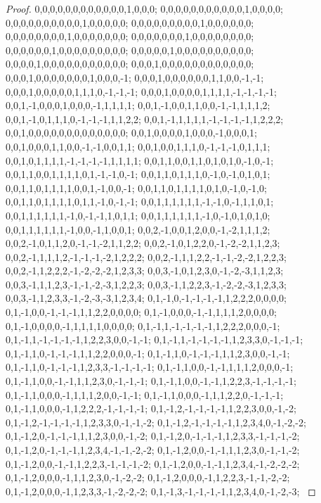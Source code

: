 \documentclass{article}
\begin{document}
\begin{proof}
{{0,0,0,0,0,0,0,0,0,0,0,0,1,0,0,0; 0,0,0,0,0,0,0,0,0,0,0,1,0,0,0,0; 0,0,0,0,0,0,0,0,0,0,1,0,0,0,0,0; 0,0,0,0,0,0,0,0,0,1,0,0,0,0,0,0; 0,0,0,0,0,0,0,0,1,0,0,0,0,0,0,0; 0,0,0,0,0,0,0,1,0,0,0,0,0,0,0,0; 0,0,0,0,0,0,1,0,0,0,0,0,0,0,0,0; 0,0,0,0,0,1,0,0,0,0,0,0,0,0,0,0; 0,0,0,0,1,0,0,0,0,0,0,0,0,0,0,0; 0,0,0,1,0,0,0,0,0,0,0,0,0,0,0,0; 0,0,0,1,0,0,0,0,0,0,0,1,0,0,0,-1; 0,0,0,1,0,0,0,0,0,0,1,1,0,0,-1,-1;
0,0,0,1,0,0,0,0,0,1,1,1,0,-1,-1,-1; 0,0,0,1,0,0,0,0,1,1,1,1,-1,-1,-1,-1; 0,0,1,-1,0,0,0,1,0,0,0,-1,1,1,1,1; 0,0,1,-1,0,0,1,1,0,0,-1,-1,1,1,1,2; 0,0,1,-1,0,1,1,1,0,-1,-1,-1,1,1,2,2; 0,0,1,-1,1,1,1,1,-1,-1,-1,-1,1,2,2,2; 0,0,1,0,0,0,0,0,0,0,0,0,0,0,0,0; 0,0,1,0,0,0,0,1,0,0,0,-1,0,0,0,1; 0,0,1,0,0,0,1,1,0,0,-1,-1,0,0,1,1; 0,0,1,0,0,1,1,1,0,-1,-1,-1,0,1,1,1; 0,0,1,0,1,1,1,1,-1,-1,-1,-1,1,1,1,1; 0,0,1,1,0,0,1,1,0,1,0,1,0,-1,0,-1;
0,0,1,1,0,0,1,1,1,1,0,1,-1,-1,0,-1; 0,0,1,1,0,1,1,1,0,-1,0,-1,0,1,0,1; 0,0,1,1,0,1,1,1,1,0,0,1,-1,0,0,-1; 0,0,1,1,0,1,1,1,1,0,1,0,-1,0,-1,0; 0,0,1,1,0,1,1,1,1,0,1,1,-1,0,-1,-1; 0,0,1,1,1,1,1,1,-1,-1,0,-1,1,1,0,1; 0,0,1,1,1,1,1,1,-1,0,-1,-1,1,0,1,1; 0,0,1,1,1,1,1,1,-1,0,-1,0,1,0,1,0; 0,0,1,1,1,1,1,1,-1,0,0,-1,1,0,0,1; 0,0,2,-1,0,0,1,2,0,0,-1,-2,1,1,1,2; 0,0,2,-1,0,1,1,2,0,-1,-1,-2,1,1,2,2; 0,0,2,-1,0,1,2,2,0,-1,-2,-2,1,1,2,3;
0,0,2,-1,1,1,1,2,-1,-1,-1,-2,1,2,2,2; 0,0,2,-1,1,1,2,2,-1,-1,-2,-2,1,2,2,3; 0,0,2,-1,1,2,2,2,-1,-2,-2,-2,1,2,3,3; 0,0,3,-1,0,1,2,3,0,-1,-2,-3,1,1,2,3; 0,0,3,-1,1,1,2,3,-1,-1,-2,-3,1,2,2,3; 0,0,3,-1,1,2,2,3,-1,-2,-2,-3,1,2,3,3; 0,0,3,-1,1,2,3,3,-1,-2,-3,-3,1,2,3,4; 0,1,-1,0,-1,-1,-1,-1,1,2,2,2,0,0,0,0; 0,1,-1,0,0,-1,-1,-1,1,1,2,2,0,0,0,0; 0,1,-1,0,0,0,-1,-1,1,1,1,2,0,0,0,0; 0,1,-1,0,0,0,0,-1,1,1,1,1,0,0,0,0; 0,1,-1,1,-1,-1,-1,-1,1,2,2,2,0,0,0,-1;
0,1,-1,1,-1,-1,-1,-1,1,2,2,3,0,0,-1,-1; 0,1,-1,1,-1,-1,-1,-1,1,2,3,3,0,-1,-1,-1; 0,1,-1,1,0,-1,-1,-1,1,1,2,2,0,0,0,-1; 0,1,-1,1,0,-1,-1,-1,1,1,2,3,0,0,-1,-1; 0,1,-1,1,0,-1,-1,-1,1,2,3,3,-1,-1,-1,-1; 0,1,-1,1,0,0,-1,-1,1,1,1,2,0,0,0,-1; 0,1,-1,1,0,0,-1,-1,1,1,2,3,0,-1,-1,-1; 0,1,-1,1,0,0,-1,-1,1,2,2,3,-1,-1,-1,-1; 0,1,-1,1,0,0,0,-1,1,1,1,2,0,0,-1,-1; 0,1,-1,1,0,0,0,-1,1,1,2,2,0,-1,-1,-1; 0,1,-1,1,0,0,0,-1,1,2,2,2,-1,-1,-1,-1; 0,1,-1,2,-1,-1,-1,-1,1,2,2,3,0,0,-1,-2;
0,1,-1,2,-1,-1,-1,-1,1,2,3,3,0,-1,-1,-2; 0,1,-1,2,-1,-1,-1,-1,1,2,3,4,0,-1,-2,-2; 0,1,-1,2,0,-1,-1,-1,1,1,2,3,0,0,-1,-2; 0,1,-1,2,0,-1,-1,-1,1,2,3,3,-1,-1,-1,-2; 0,1,-1,2,0,-1,-1,-1,1,2,3,4,-1,-1,-2,-2; 0,1,-1,2,0,0,-1,-1,1,1,2,3,0,-1,-1,-2; 0,1,-1,2,0,0,-1,-1,1,2,2,3,-1,-1,-1,-2; 0,1,-1,2,0,0,-1,-1,1,2,3,4,-1,-2,-2,-2; 0,1,-1,2,0,0,0,-1,1,1,2,3,0,-1,-2,-2; 0,1,-1,2,0,0,0,-1,1,2,2,3,-1,-1,-2,-2; 0,1,-1,2,0,0,0,-1,1,2,3,3,-1,-2,-2,-2; 0,1,-1,3,-1,-1,-1,-1,1,2,3,4,0,-1,-2,-3;
}}
\end{proof}
\end{document}
